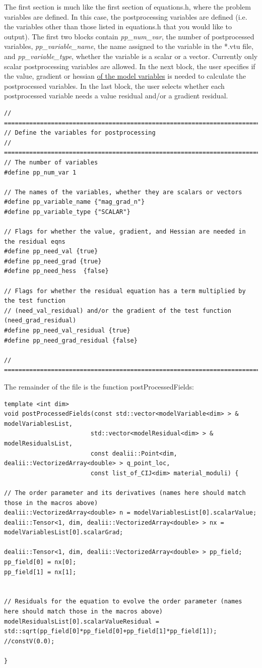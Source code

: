 \documentclass[10pt]{article} %
\begin{document}
The first section is much like the first section of equations.h, where the problem variables are defined. In this case, the postprocessing variables are defined (i.e. the variables other than those listed in equations.h that you would like to output). The first two blocks contain \emph{pp\_num\_var}, the number of postprocessed variables, \emph{pp\_variable\_name}, the name assigned to the variable in the *.vtu file, and \emph{pp\_variable\_type}, whether the variable is a scalar or a vector. Currently only scalar postprocessing variables are allowed. In the next block, the user specifies if the value, gradient or hessian \underline{of the model variables} is needed to calculate the postprocessed variables. In the last block, the user selects whether each postprocessed variable needs a value residual and/or a gradient residual.
 \tiny
\begin{lstlisting} 
// =================================================================================
// Define the variables for postprocessing
// =================================================================================
// The number of variables
#define pp_num_var 1

// The names of the variables, whether they are scalars or vectors 
#define pp_variable_name {"mag_grad_n"}
#define pp_variable_type {"SCALAR"}

// Flags for whether the value, gradient, and Hessian are needed in the residual eqns
#define pp_need_val {true}
#define pp_need_grad {true}
#define pp_need_hess  {false}

// Flags for whether the residual equation has a term multiplied by the test function
// (need_val_residual) and/or the gradient of the test function (need_grad_residual)
#define pp_need_val_residual {true}
#define pp_need_grad_residual {false}

// =================================================================================
\end{lstlisting} 
\normalsize

The remainder of the file is the function postProcessedFields:
 \tiny
\begin{lstlisting} 
template <int dim>
void postProcessedFields(const std::vector<modelVariable<dim> > & modelVariablesList,
						std::vector<modelResidual<dim> > & modelResidualsList,
						const dealii::Point<dim, dealii::VectorizedArray<double> > q_point_loc,
						const list_of_CIJ<dim> material_moduli) {

// The order parameter and its derivatives (names here should match those in the macros above)
dealii::VectorizedArray<double> n = modelVariablesList[0].scalarValue;
dealii::Tensor<1, dim, dealii::VectorizedArray<double> > nx = modelVariablesList[0].scalarGrad;

dealii::Tensor<1, dim, dealii::VectorizedArray<double> > pp_field;
pp_field[0] = nx[0];
pp_field[1] = nx[1];


// Residuals for the equation to evolve the order parameter (names here should match those in the macros above)
modelResidualsList[0].scalarValueResidual = std::sqrt(pp_field[0]*pp_field[0]+pp_field[1]*pp_field[1]); //constV(0.0);

}
\end{lstlisting} 
\normalsize
\end{document}
